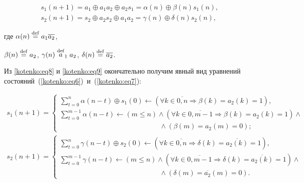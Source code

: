 \begin{gather}

\label{kotenko:eq8}

s_1 (n+1)=a_1 \oplus a_1 a_2 \oplus a_2 s_1 =\alpha ( n )\oplus

\beta ( n )s_1 ( n ),\\

\label{kotenko:eq9}

s_2 (n+1)=s_2 \oplus a_2 s_2 \oplus a_1 a_2 =\gamma ( n )\oplus

\delta ( n )s_2 ( n ),

\end{gather}

где $\alpha ( n ) \stackrel{\rm def}{=} a_1 \overline {a_2}$,

$\beta ( n )\stackrel{\rm def}=a_2$, $\gamma (n) \stackrel{\rm def} a_1 a_2$, $\delta ( n ) \stackrel

{\rm def}= \overline{a_2}$.



Из \eqref{kotenko:eq8} и \eqref{kotenko:eq9} окончательно получим явный вид уравнений состояний~(\ref{kotenko:eq6})~и~(\ref{kotenko:eq7}):

\begin{gather*}

s_1 (n+1)=\begin{cases}

\sum\limits_{t=0}^n \alpha (n-t) \oplus s_1 (0)\leftarrow \left( \forall k\in \overline {0,n} \Rightarrow \beta

( k )=a_2 ( k )=1\right), \\

\sum\limits_{t=0}^{m-1} \alpha ( n-t ) \leftarrow (m\le n)\wedge \left(\forall k\in \overline {0,m-1} \Rightarrow

\beta ( k )=a_2 ( k )=1 \right)\wedge \\ \hspace{6cm} \wedge(\beta( m )=a_2 ( m )=0);

\end{cases}\\

s_2 (n+1)=\begin{cases}

\sum\limits_{t=0}^n \gamma (n-t) \oplus s_2 ( 0 ) \leftarrow \left(\forall k\in \overline {0,n} \Rightarrow \delta

( k )=\overline {a_2 ( k )} =1 \right), \\

\sum\limits_{t=0}^{m-1} \gamma ( n-t ) \leftarrow (m\le n) \wedge \left( \forall k\in \overline {0,m-1} \Rightarrow

\delta ( k )=\overline {a_2 ( k )} =1 \right)\wedge \\

\hspace{6cm}

\wedge

\left( \delta ( m )=\overline {a_2} ( m )=0\right).

\end{cases}

\end{gather*}



